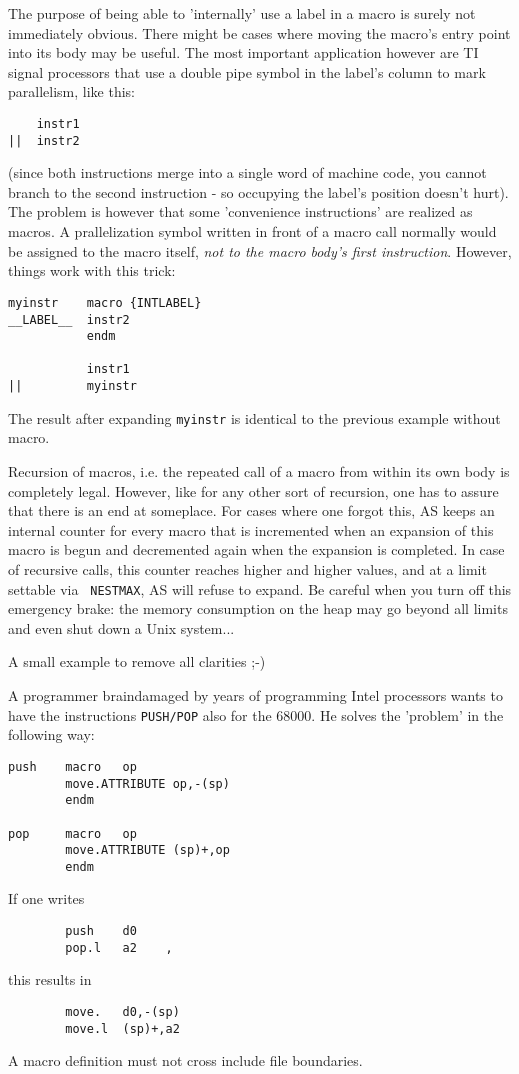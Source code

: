 \documentclass[12pt,twoside]{report}
\newcommand{\tty}[1]{{\tt #1}}
\begin{document}
The purpose of being able to 'internally' use a label in a macro is surely
not immediately obvious.  There might be cases where moving the macro's
entry point into its body may be useful.  The most important application
however are TI signal processors that use a double pipe symbol in the
label's column to mark parallelism, like this:
\begin{verbatim}
    instr1
||  instr2
\end{verbatim}
(since both instructions merge into a single word of machine code, you
cannot branch to the second instruction - so occupying the label's
position doesn't hurt).  The problem is however that some 'convenience
instructions' are realized as macros.  A prallelization symbol written in
front of a macro call normally would be assigned to the macro itself, {\it
not to the macro body's first instruction}.  However, things work with
this trick:
\begin{verbatim}
myinstr    macro {INTLABEL}
__LABEL__  instr2
           endm

           instr1
||         myinstr
\end{verbatim}
The result after expanding {\tt myinstr} is identical to the previous
example without macro.

Recursion of macros, i.e. the repeated call of a macro from within its own
body is completely legal.  However, like for any other sort of recursion,
one has to assure that there is an end at someplace.  For cases where one
forgot this, AS keeps an internal counter for every macro that is
incremented when an expansion of this macro is begun and decremented again
when the expansion is completed.  In case of recursive calls, this counter
reaches higher and higher values, and at a limit settable via {\tt
NESTMAX}, AS will refuse to expand. Be careful when you turn off this
emergency brake: the memory consumption on the heap may go beyond all
limits and even shut down a Unix system...

A small example to remove all clarities ;-)

A programmer braindamaged by years of programming Intel processors
wants to have the instructions \tty{PUSH/POP} also for the 68000.  He
solves the 'problem' in the following way:
\begin{verbatim}
push    macro   op
        move.ATTRIBUTE op,-(sp)
        endm

pop     macro   op
        move.ATTRIBUTE (sp)+,op
        endm
\end{verbatim}
If one writes
\begin{verbatim}
        push    d0
        pop.l   a2    ,
\end{verbatim}
this results in
\begin{verbatim}
        move.   d0,-(sp)
        move.l  (sp)+,a2
\end{verbatim}
A macro definition must not cross include file boundaries.
\end{document}
